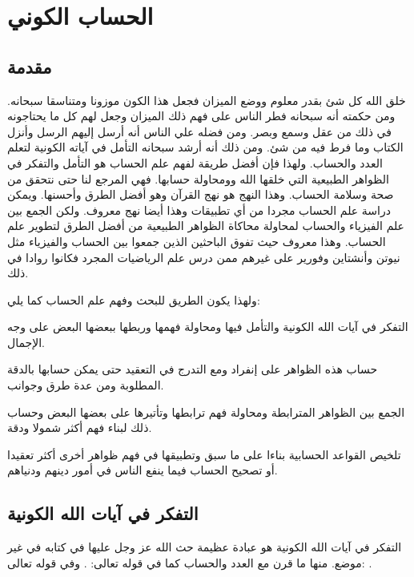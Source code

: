 \chapter{الحساب الكوني}


\section{مقدمة}
خلق الله كل شئ بقدر معلوم ووضع الميزان فجعل هذا الكون موزونا ومتناسقا سبحانه. ومن حكمته أنه سبحانه فطر الناس على فهم ذلك الميزان وجعل لهم كل ما يحتاجونه في ذلك من عقل وسمع وبصر. ومن فضله علي الناس أنه أرسل إليهم الرسل وأنزل الكتاب وما فرط فيه من شئ. ومن ذلك أنه أرشد سبحانه التأمل في آياته الكونية لتعلم العدد والحساب. ولهذا فإن أفضل طريقة لفهم علم الحساب هو التأمل والتفكر في الظواهر الطبيعية التي خلقها الله وومحاولة حسابها. فهي المرجع لنا حتى نتحقق من صحة وسلامة الحساب. وهذا النهج هو نهج القرآن وهو أفضل الطرق وأحسنها. ويمكن دراسة علم الحساب مجردا من أي تطبيقات وهذا أيضا نهج معروف. ولكن الجمع بين علم الفيزياء والحساب لمحاولة محاكاة الظواهر الطبيعية من أفضل الطرق لتطوير علم الحساب. وهذا معروف حيث تفوق الباحثين الذين جمعوا بين الحساب والفيزياء مثل نيوتن وأنشتاين وفورير على غيرهم ممن درس علم الرياضيات المجرد فكانوا روادا في ذلك.

ولهذا يكون الطريق للبحث وفهم علم الحساب كما يلي:
\begin{compactenum}
  \item التفكر في آيات الله الكونية والتأمل فيها ومحاولة فهمها وربطها ببعضها البعض على وجه الإجمال.
  \item حساب هذه الظواهر على إنفراد ومع التدرج في التعقيد حتى يمكن حسابها بالدقة المطلوبة ومن عدة طرق وجوانب.
  \item الجمع بين الظواهر المترابطة ومحاولة فهم ترابطها وتأتيرها على بعضها البعض وحساب ذلك لبناء فهم أكثر شمولا ودقة.
  \item تلخيص القواعد الحسابية بناءا على ما سبق وتطبيقها في فهم ظواهر أخرى أكثر تعقيدا أو تصحيح الحساب فيما ينفع الناس في أمور دينهم ودنياهم.
\end{compactenum}

\section{التفكر في آيات الله الكونية}
التفكر في آيات الله الكونية هو عبادة عظيمة حث الله عز وجل عليها في كتابه في غير موضع. منها ما قرن مع العدد والحساب كما في قوله تعالى:
\quranayah*[17][12]{\footnotesize \surahname*[17]}.
وفي قوله تعالى: \quranayah*[10][5]{\footnotesize \surahname*[10]}.

